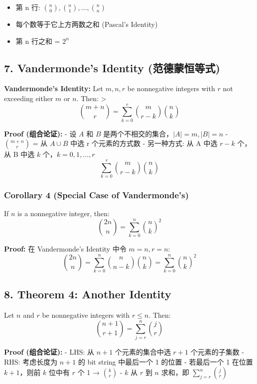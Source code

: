 \documentclass[10pt,a4paper,openany]{ctexbook}
\theoremstyle{definition}
\theoremstyle{remark}
\renewenvironment{quote}
  {\list{}{\leftmargin=1em\rightmargin=0pt\topsep=0.5pt\partopsep=0pt}\item[]}
  {\endlist}
\begin{document}
\begin{itemize}
\item 第 n 行: $\binom{n}{0}, \binom{n}{1}, \ldots, \binom{n}{n}$
\item 每个数等于它上方两数之和 (Pascal's Identity)
\item 第 n 行之和 = $2^n$

\end{itemize}

\vspace{-2pt}

\subsection{7. Vandermonde's Identity (范德蒙恒等式)}

\begin{quote}
\textbf{Vandermonde's Identity:} Let $m, n, r$ be nonnegative integers with $r$ not exceeding either $m$ or $n$. Then:
>
\[
\binom{m+n}{r} = \sum_{k=0}^{r} \binom{m}{r-k} \binom{n}{k}
\]


\textbf{Proof (组合论证):}
- 设 $A$ 和 $B$ 是两个不相交的集合，$|A| = m, |B| = n$
- $\binom{m+n}{r}$ = 从 $A \cup B$ 中选 r 个元素的方式数
- 另一种方式: 从 A 中选 $r-k$ 个，从 B 中选 $k$ 个，$k = 0, 1, \ldots, r$
\[
\sum_{k=0}^{r} \binom{m}{r-k} \binom{n}{k}
\]


\end{quote}

\subsubsection{Corollary 4 (Special Case of Vandermonde's)}

\begin{quote}
If $n$ is a nonnegative integer, then:
\[
\binom{2n}{n} = \sum_{k=0}^{n} \binom{n}{k}^2
\]


\textbf{Proof:} 在 Vandermonde's Identity 中令 $m = n, r = n$:
\[
\binom{2n}{n} = \sum_{k=0}^{n} \binom{n}{n-k} \binom{n}{k} = \sum_{k=0}^{n} \binom{n}{k}^2
\]


\end{quote}
\vspace{-2pt}

\subsection{8. Theorem 4: Another Identity}

\begin{quote}
Let $n$ and $r$ be nonnegative integers with $r \le n$. Then:
\[
\binom{n+1}{r+1} = \sum_{j=r}^{n} \binom{j}{r}
\]


\textbf{Proof (组合论证):}
- LHS: 从 $n+1$ 个元素的集合中选 $r+1$ 个元素的子集数
- RHS: 考虑长度为 $n+1$ 的 bit string 中最后一个 1 的位置
- 若最后一个 1 在位置 $k+1$，则前 $k$ 位中有 $r$ 个 1 → $\binom{k}{r}$
- $k$ 从 $r$ 到 $n$ 求和，即 $\sum_{j=r}^{n} \binom{j}{r}$

\end{quote}
\vspace{-2pt}
\end{document}
